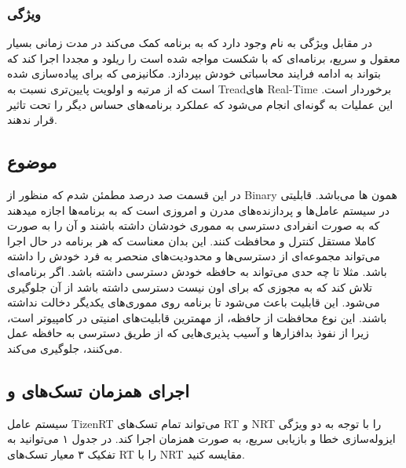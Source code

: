 \documentclass[10pt, a4paper]{article}
\begin{document}
\subsubsection{ویژگی }

در مقابل ویژگی به نام  وجود دارد که به برنامه کمک می‌کند در
مدت زمانی بسیار معقول و سریع، برنامه‌ای که با شکست مواجه شده‌ است را ریلود و
مجددا اجرا کند که بتواند به ادامه فرایند محاسباتی خودش بپردازد. مکانیزمی که برای
 پیاده‌سازی شده است که از مرتبه و اولویت پایین‌تری نسبت به
Treadهای Real-Time برخوردار است. این عملیات به گونه‌ای انجام می‌شود که عملکرد
برنامه‌های حساس دیگر  را تحت تاثیر قرار ندهند.

\subsection{موضوع }

در این قسمت صد درصد مطمئن شدم که منظور از Binary همون ها
می‌باشد. قابلیتی در سیستم عامل‌ها و پردازنده‌های مدرن و امروزی است که به
برنامه‌ها اجازه میدهند که به صورت انفرادی دسترسی به مموری خودشان داشته باشند و
آن را به صورت کاملا مستقل کنترل و محافظت کنند. این بدان معناست که هر برنامه در
حال اجرا می‌تواند مجموعه‌ای از دسترسی‌ها و محدودیت‌های منحصر به فرد خودش را
داشته باشد. مثلا تا چه حدی می‌تواند به حافظه خودش دسترسی داشته باشد. اگر
برنامه‌ای تلاش کند که به مجوزی که برای اون نیست دسترسی داشته باشد از آن جلوگیری
می‌شود. این قابلیت باعث می‌شود تا برنامه روی مموری‌های یکدیگر دخالت نداشته
باشند. این نوع محافظت از حافظه، از مهمترین قابلیت‌های امنیتی در کامپیوتر است،
زیرا از نفوذ بدافزار‌ها و آسیب پذیری‌هایی که از طریق دسترسی به حافظه عمل
می‌کنند، جلوگیری می‌کند.

\subsection{اجرای همزمان تسک‌های  و }

سیستم عامل TizenRT می‌تواند تمام تسک‌های RT و NRT را با توجه به دو ویژگی
ایزوله‌سازی خطا و بازیابی سریع، به صورت همزمان اجرا کند. در جدول ۱ می‌توانید به
تفکیک ۳ معیار تسک‌های RT را با NRT مقایسه کنید.

\begin{table}[h]
    \centering
    \begin{RTL}
      \caption{
      تسک‌ها}
    \end{RTL}
\end{table}
\end{document}
